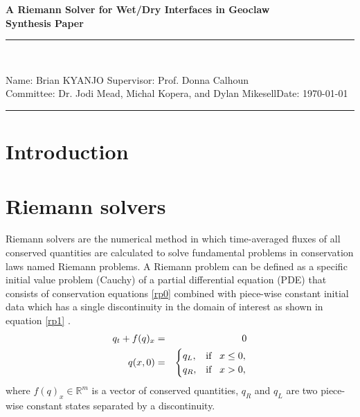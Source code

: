 \documentclass[11pt,a4paper]{article}
\newcommand{\donna}[1]{{\color{red}{#1}}}
\newcommand{\student}{Brian KYANJO }
\newcommand{\course}{Dr. Jodi Mead, Michal Kopera, and Dylan Mikesell}
\newcommand{\assignment}{ Prof. Donna Calhoun}
\begin{document}
	
	\thispagestyle{empty}
	\begin{center}
		\textbf{A Riemann Solver for Wet/Dry Interfaces in Geoclaw \\[0.5cm]
			Synthesis Paper}
		\vspace{.2cm}
	\end{center}
	
\begin{center}
		\rule{17cm}{0.2cm}\\[0.3cm]
\end{center}	

\noindent	Name: \student \hfill Supervisor: \assignment\\[0.1cm]
	Committee: \course \hfill Date: \today\\
	\rule{17cm}{0.05cm}
	\vspace{.2cm}
	
	\section{Introduction}
	
	
	
	\section{Riemann solvers}
	Riemann solvers are the numerical method in which time-averaged fluxes of all conserved quantities are calculated to solve fundamental problems in conservation laws named Riemann problems.   A Riemann problem can be defined as a specific initial value problem  (Cauchy) of a partial differential equation (PDE) that consists of conservation equations \eqref{rp0}  combined with piece-wise constant initial data which has a single discontinuity in the domain of interest as shown in equation \eqref{rp1}  \citep{ge:2011}. 
	\begin{eqnarray}
		q_{t} + f(q)_{x}& =& 0
		\label{rp0}\\
		q(x,0)& =& \begin{cases}
			q_{L}, & \text{if \, $x \le 0,$}\\
			q_{R},& \text{if \, $x > 0,$}\\
			
		\end{cases}  
		\label{rp1}     
	\end{eqnarray}
	where $f(q)_{x} \in \mathbb{R}^{m}$ is a vector of conserved quantities,  $q_{R}$ and $q_{L}$ are two piece-wise constant states separated by a discontinuity. 
	
\end{document}
